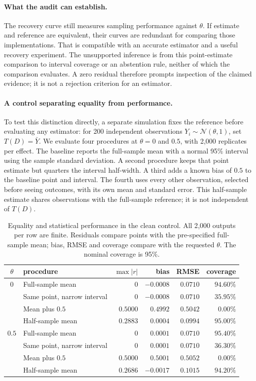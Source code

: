 \paragraph{What the audit can establish.}
The recovery curve still measures sampling performance against $\theta$.
If estimate and reference are equivalent, their curves are redundant for
comparing those implementations. That is compatible with an accurate estimator
and a useful recovery experiment. The unsupported inference is from this
point-estimate comparison to interval coverage or an abstention rule, neither
of which the comparison evaluates. A zero residual therefore prompts inspection
of the claimed evidence; it is not a rejection criterion for an estimator.

\paragraph{A control separating equality from performance.}
To test this distinction directly, a separate simulation fixes the reference
before evaluating any estimator: for 200 independent observations
$Y_i\sim\mathcal N(\theta,1)$, set $T(D)=\bar Y$. We evaluate four procedures
at $\theta=0$ and $0.5$, with 2{,}000 replicates per effect. The baseline
reports the full-sample mean with a normal 95\% interval using the sample
standard deviation. A second procedure keeps that point estimate but quarters
the interval half-width. A third adds a known bias of $0.5$ to the baseline
point and interval. The fourth uses every other observation, selected before
seeing outcomes, with its own mean and standard error. This half-sample
estimate shares observations with the full-sample reference; it is not
independent of $T(D)$.

\begin{table}[htbp]
\centering\small
\caption{Equality and statistical performance in the clean control. All
2{,}000 outputs per row are finite. Residuals compare points with the
pre-specified full-sample mean; bias, RMSE and coverage compare with the
requested $\theta$. The nominal coverage is 95\%.}
\label{tab:cleancontrol}
\begin{tabular}{@{}clrrrr@{}}
\toprule
$\theta$ & procedure & $\max|r|$ & bias & RMSE & coverage \\
\midrule
$0$ & Full-sample mean & $0$ & $-0.0008$ & $0.0710$ & $94.60\%$ \\
 & Same point, narrow interval & $0$ & $-0.0008$ & $0.0710$ & $35.95\%$ \\
 & Mean plus $0.5$ & $0.5000$ & $0.4992$ & $0.5042$ & $0.00\%$ \\
 & Half-sample mean & $0.2883$ & $0.0004$ & $0.0994$ & $95.00\%$ \\
\midrule
$0.5$ & Full-sample mean & $0$ & $0.0001$ & $0.0710$ & $95.40\%$ \\
 & Same point, narrow interval & $0$ & $0.0001$ & $0.0710$ & $36.30\%$ \\
 & Mean plus $0.5$ & $0.5000$ & $0.5001$ & $0.5052$ & $0.00\%$ \\
 & Half-sample mean & $0.2686$ & $-0.0017$ & $0.1015$ & $94.20\%$ \\
\bottomrule
\end{tabular}
\end{table}

